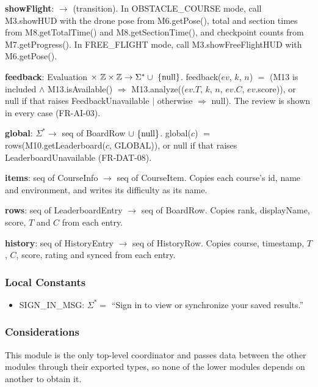 \documentclass[12pt, titlepage]{article}
\newcommand{\nul}{\textnormal{null}}
\begin{document}
\noindent \textbf{showFlight}: $\rightarrow$ (transition).
In OBSTACLE\_COURSE mode, call M3.showHUD with the drone pose from
M6.getPose(), total and section times from M8.getTotalTime() and
M8.getSectionTime(), and checkpoint counts from M7.getProgress().
In FREE\_FLIGHT mode, call M3.showFreeFlightHUD with M6.getPose().

\noindent \textbf{feedback}: Evaluation $\times\ \mathbb{Z} \times
\mathbb{Z} \rightarrow \Sigma^* \cup \ \{\nul\}$. feedback($ev$, $k$, $n$)
$=$ (M13 is included $\wedge$ M13.isAvailable() $\Rightarrow$
M13.analyze(($ev.T$, $k$, $n$, $ev.C$, $ev$.score)), or \nul{} if that raises
FeedbackUnavailable $|$ otherwise $\Rightarrow$ \nul). The review is shown in
every case (FR-AI-03).

\noindent \textbf{global}: $\Sigma^* \rightarrow$ seq of BoardRow $\cup
\ \{\nul\}$. global($c$) $=$ rows(M10.getLeaderboard($c$, GLOBAL)), or \nul{}
if that raises LeaderboardUnavailable (FR-DAT-08).

\noindent \textbf{items}: seq of CourseInfo $\rightarrow$ seq of CourseItem.
Copies each course's id, name and environment, and writes its difficulty as
its name.

\noindent \textbf{rows}: seq of LeaderboardEntry $\rightarrow$ seq of
BoardRow. Copies rank, displayName, score, $T$ and $C$ from each entry.

\noindent \textbf{history}: seq of HistoryEntry $\rightarrow$ seq of
HistoryRow. Copies course, timestamp, $T$, $C$, score, rating and synced from
each entry.

\subsubsection{Local Constants}

\begin{itemize}
\item SIGN\_IN\_MSG: $\Sigma^* =$ ``Sign in to view or synchronize your saved
  results.''
\end{itemize}

\subsubsection{Considerations}

This module is the only top-level coordinator and passes data between the
other modules through their exported types, so none of the lower modules
depends on another to obtain it.

\newpage
\end{document}
